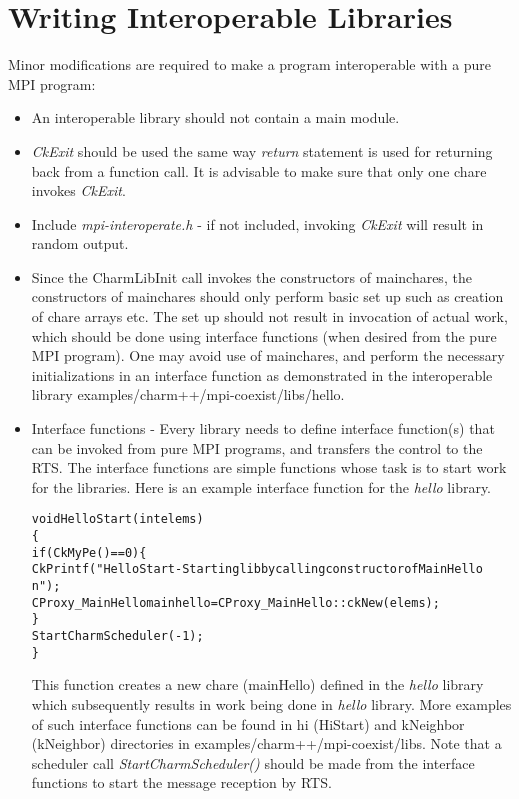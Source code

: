\section{Writing Interoperable \charmpp{} Libraries}
Minor modifications are required to make a \charmpp{} program interoperable with a pure
MPI program:
\begin{itemize}
\item An interoperable \charmpp{} library should not contain a main module.
\item {\em CkExit} should be used the same way {\em return} statement is used for returning
back from a function call. It is advisable to make sure that only one chare
invokes {\em CkExit}.
\item Include {\em mpi-interoperate.h} - if not included, invoking {\em CkExit} will result 
in random output.
\item Since the CharmLibInit call invokes the constructors of mainchares, the
constructors of mainchares should only perform basic set up such as creation of chare
arrays etc. The set up should not result in invocation of actual work, which
should be done using interface functions (when desired from the pure MPI
program). One may avoid use of mainchares, and perform the necessary
initializations in an interface function as demonstrated in the interoperable
library examples/charm++/mpi-coexist/libs/hello.
\item Interface functions - Every library needs to define interface function(s) 
that can be invoked from pure MPI programs, and transfers the control to the 
\charmpp{} RTS. The interface functions are simple functions whose task is to
start work for the \charmpp{} libraries. Here is an example interface function for the
{\em hello} library. 
\begin{alltt}
void HelloStart(int elems)
\{
  if(CkMyPe() == 0) \{
  CkPrintf("HelloStart - Starting lib by calling constructor of MainHello\\n");
  CProxy\_MainHello mainhello = CProxy\_MainHello::ckNew(elems);
  \}
  StartCharmScheduler(-1);
\}
\end{alltt}

This function creates a new chare (mainHello) defined in the {\em hello} library which
subsequently results in work being done in {\em hello} library.
More examples of such interface functions can 
be found in hi (HiStart) and kNeighbor (kNeighbor) directories in 
examples/charm++/mpi-coexist/libs. Note that a scheduler call {\em
StartCharmScheduler()} should be made from the interface functions to start the
message reception by \charmpp{} RTS.
\end{itemize}

